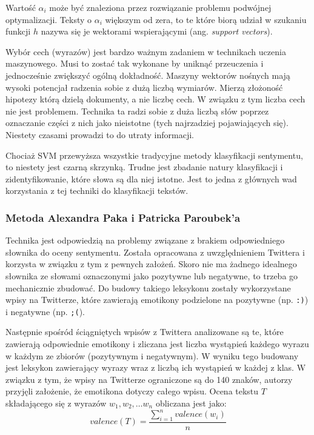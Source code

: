 Wartość $\alpha_i$ może być znaleziona przez rozwiązanie problemu podwójnej 
optymalizacji. Teksty o $\alpha_i$ większym od zera, to te które biorą udział
w szukaniu funkcji $h$ nazywa się je wektorami wspierającymi 
(ang. \textit{support vectors}).

Wybór cech (wyrazów) jest bardzo ważnym zadaniem w technikach uczenia maszynowego.
Musi to zostać tak wykonane by uniknąć przeuczenia i jednocześnie zwiększyć
ogólną dokładność. Maszyny wektorów nośnych mają wysoki potencjał radzenia
sobie z dużą liczbą wymiarów. Mierzą złożoność hipotezy którą dzielą dokumenty, 
a nie liczbę cech. W związku z tym liczba cech nie jest problemem.
Technika ta radzi sobie z duża liczbą słów poprzez oznaczanie części z nich jako
nieistotne (tych najrzadziej pojawiających się). Niestety czasami prowadzi to 
do utraty informacji. 

Chociaż SVM przewyższa wszystkie tradycyjne metody klasyfikacji sentymentu,
to niestety jest czarną skrzynką. Trudne jest zbadanie natury klasyfikacji i
zidentyfikowanie, które słowa są dla niej istotne. Jest to jedna z głównych wad
korzystania z tej techniki do klasyfikacji tekstów. 

\subsubsection{Metoda Alexandra Paka i Patricka Paroubek'a}
\label{subsubsection:pakandparoubek}
Technika jest odpowiedzią na problemy związane z brakiem odpowiedniego słownika
do oceny sentymentu. Została opracowana z uwzględnieniem Twittera i korzysta
w związku z tym z pewnych założeń. Skoro nie ma żadnego idealnego słownika
ze słowami oznaczonymi jako pozytywne lub negatywne, to trzeba go mechanicznie
zbudować. Do budowy takiego leksykonu zostały wykorzystane wpisy na Twitterze,
które zawierają emotikony podzielone na pozytywne (np. \texttt{:)}) i 
negatywne (np. \texttt{;(}). 

Następnie spośród ściągniętych wpisów z Twittera analizowane są te,
które zawierają odpowiednie emotikony i zliczana jest liczba wystąpień
każdego wyrazu w każdym ze zbiorów (pozytywnym i negatywnym).
W wyniku tego budowany jest leksykon zawierający wyrazy wraz z liczbą
ich wystąpień w każdej z klas.
W związku z tym, że wpisy na Twitterze ograniczone są do 140 znaków, autorzy przyjęli
założenie, że emotikona dotyczy całego wpisu. 
Ocena tekstu $T$ składającego się z wyrazów $w_1, w_2, \ldots w_n$ obliczana 
jest jako:
\begin{equation}
valence(T) = \frac{\sum\limits_{i = 1}^n valence(w_i)}{n}
\end{equation}


